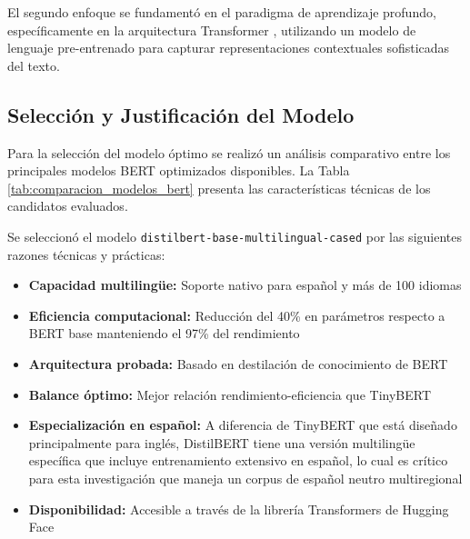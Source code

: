 El segundo enfoque se fundamentó en el paradigma de aprendizaje profundo, específicamente en la arquitectura Transformer \cite{vaswani2017attention}, utilizando un modelo de lenguaje pre-entrenado para capturar representaciones contextuales sofisticadas del texto.

\subsection{Selección y Justificación del Modelo}

Para la selección del modelo óptimo se realizó un análisis comparativo entre los principales modelos BERT optimizados disponibles. La Tabla \ref{tab:comparacion_modelos_bert} presenta las características técnicas de los candidatos evaluados.

\begin{table}[htbp]
\centering
{}
\caption{Comparación de modelos BERT optimizados para la tarea de clasificación.}
\label{tab:comparacion_modelos_bert}
\end{table}

Se seleccionó el modelo \texttt{distilbert-base-multilingual-cased} por las siguientes razones técnicas y prácticas:

\begin{itemize}
    \item \textbf{Capacidad multilingüe:} Soporte nativo para español y más de 100 idiomas
    \item \textbf{Eficiencia computacional:} Reducción del 40\% en parámetros respecto a BERT base manteniendo el 97\% del rendimiento \cite{sanh2019distilbert}
    \item \textbf{Arquitectura probada:} Basado en destilación de conocimiento de BERT \cite{devlin2018bert}
    \item \textbf{Balance óptimo:} Mejor relación rendimiento-eficiencia que TinyBERT \cite{jiao2019tinybert}
    \item \textbf{Especialización en español:} A diferencia de TinyBERT que está diseñado principalmente para inglés, DistilBERT tiene una versión multilingüe específica que incluye entrenamiento extensivo en español, lo cual es crítico para esta investigación que maneja un corpus de español neutro multiregional
    \item \textbf{Disponibilidad:} Accesible a través de la librería Transformers de Hugging Face
\end{itemize}

